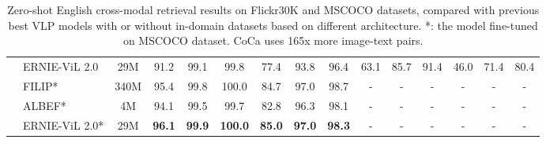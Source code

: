 \documentclass{article}
\begin{document}
\begin{table*}[]
{\begin{tabular}{@{}llccccccccccccc@{}}
\multicolumn{1}{c}{}                    & \multicolumn{1}{l|}{ERNIE-ViL 2.0}      & \multicolumn{1}{c|}{29M}      & {91.2} & {99.1} & \multicolumn{1}{c|}{{99.8}} & { 77.4} & {93.8} & \multicolumn{1}{c|}{{96.4}} & {63.1} & {85.7} & \multicolumn{1}{c|}{{91.4}} & {46.0} & {71.4} & {80.4} \\ \cmidrule(l){2-15} 
\multicolumn{1}{c}{}                    & \multicolumn{1}{l|}{FILIP*}      & \multicolumn{1}{c|}{340M}     & 95.4          & 99.8           & \multicolumn{1}{c|}{100.0}          & 84.7          & 97.0          & \multicolumn{1}{c|}{98.7}          & -             & -             & \multicolumn{1}{c|}{-}             & -                   & -             & -             \\
\multicolumn{1}{c}{}                    & \multicolumn{1}{l|}{ALBEF*}      & \multicolumn{1}{c|}{4M}       & 94.1          & 99.5           & \multicolumn{1}{c|}{99.7}           & 82.8          & 96.3          & \multicolumn{1}{c|}{98.1}          & -             & -             & \multicolumn{1}{c|}{-}             & -                   & -             & -             \\
\multicolumn{1}{c}{}                    & \multicolumn{1}{l|}{ERNIE-ViL 2.0*}     & \multicolumn{1}{c|}{29M}      & \textbf{96.1} & \textbf{99.9}  & \multicolumn{1}{c|}{\textbf{100.0}} & \textbf{85.0} & \textbf{97.0} & \multicolumn{1}{c|}{\textbf{98.3}} & -             & -             & \multicolumn{1}{c|}{-}             & -                   & -             & -            
     \\ \bottomrule
\end{tabular}
}
\caption{ Zero-shot English cross-modal retrieval results on Flickr30K and MSCOCO datasets, compared with previous best VLP models with or without in-domain datasets based on different architecture. *: the model fine-tuned on MSCOCO dataset. CoCa uses 165x more image-text pairs.}
\label{table:crossretrieval_zero-shot}
\end{table*}
\end{document}
